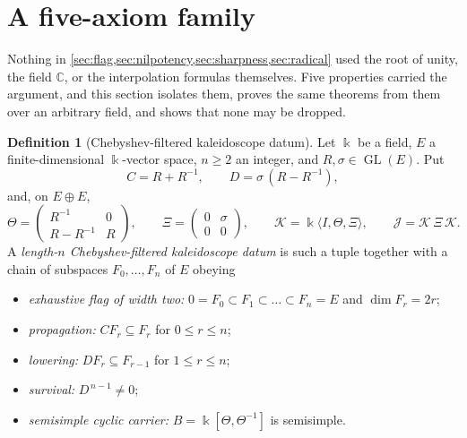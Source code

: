 \documentclass[11pt,reqno]{amsart}
\theoremstyle{plain}
\theoremstyle{definition}
\newtheorem{definition}[theorem]{Definition}
\theoremstyle{remark}
\numberwithin{equation}{section}
\begin{document}
\section{A five-axiom family}
\label{sec:axioms}

Nothing in \cref{sec:flag,sec:nilpotency,sec:sharpness,sec:radical} used the
root of unity, the field $\mathbb{C}$, or the interpolation formulas
themselves. Five properties carried the argument, and this section isolates
them, proves the same theorems from them over an arbitrary field, and shows
that none may be dropped.

\begin{definition}[Chebyshev-filtered kaleidoscope datum]
\label{def:datum}
Let $\Bbbk$ be a field, $E$ a finite-dimensional $\Bbbk$-vector space,
$n\ge2$ an integer, and $R,\sigma\in\operatorname{GL}(E)$. Put
\begin{equation*}
  C=R+R^{-1},
  \qquad
  D=\sigma\,(R-R^{-1}),
\end{equation*}
and, on $E\oplus E$,
\begin{equation*}
  \Theta=\begin{pmatrix}R^{-1}&0\\R-R^{-1}&R\end{pmatrix},
  \qquad
  \Xi=\begin{pmatrix}0&\sigma\\0&0\end{pmatrix},
  \qquad
  \mathcal{K}=\Bbbk\langle I,\Theta,\Xi\rangle,
  \qquad
  \mathcal{J}=\mathcal{K}\,\Xi\,\mathcal{K}.
\end{equation*}
A \emph{length-$n$ Chebyshev-filtered kaleidoscope datum} is such a tuple
together with a chain of subspaces $F_{0},\dots,F_{n}$ of $E$ obeying
\begin{itemize}
  \item[(A1)] \emph{exhaustive flag of width two:}
    $0=F_{0}\subset F_{1}\subset\dots\subset F_{n}=E$ and $\dim F_{r}=2r$;
  \item[(A2)] \emph{propagation:} $CF_{r}\subseteq F_{r}$ for $0\le r\le n$;
  \item[(A3)] \emph{lowering:} $DF_{r}\subseteq F_{r-1}$ for $1\le r\le n$;
  \item[(A4)] \emph{survival:} $D^{\,n-1}\ne0$;
  \item[(A5)] \emph{semisimple cyclic carrier:}
    $B=\Bbbk[\Theta,\Theta^{-1}]$ is semisimple.
\end{itemize}
\end{definition}
\end{document}

